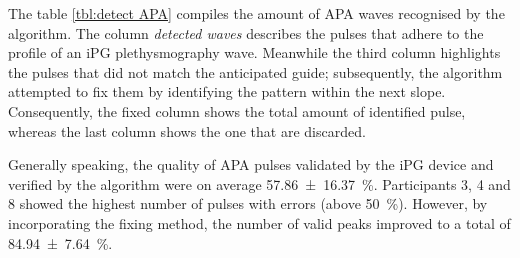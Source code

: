 The table \ref{tbl:detect APA} compiles the amount of APA waves recognised by the algorithm. The column \textit{detected waves} describes the pulses that adhere to the profile of an iPG plethysmography wave. Meanwhile the third column highlights the pulses that did not match the anticipated guide; subsequently, the algorithm attempted to fix them by identifying the pattern within the next slope. Consequently, the fixed column shows the total amount of identified pulse, whereas the last column shows the one that are discarded.

Generally speaking, the quality of APA pulses validated by the iPG device and verified by the algorithm were on average \SI{57.86(1637)}{\percent}. Participants 3, 4 and 8 showed the highest number of pulses with errors (above \SI{50}{\percent}). However, by incorporating the fixing method, the number of valid peaks improved to a total of \SI{84.94(764)}{\percent}.

